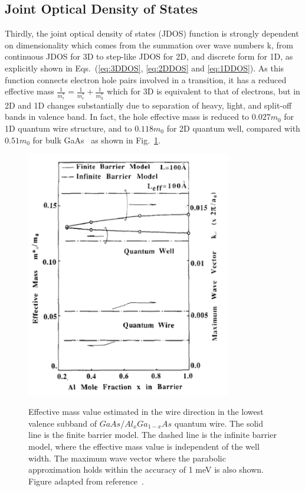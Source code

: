 \subsection{Joint Optical Density of States}

Thirdly, the joint optical density of states (JDOS) function is strongly
dependent on dimensionality which comes from the summation over wave numbers k,
from continuous JDOS for 3D to step-like JDOS for 2D, and discrete form for 1D,
as explicitly shown in Eqs.~(\ref{eq:3DDOS}, \ref{eq:2DDOS} and
\ref{eq:1DDOS}). As this function connects electron hole pairs involved in a
transition, it has a reduced effective mass
$\frac{1}{m_r^\ast}=\frac{1}{m_e^\ast}+\frac{1}{m_h^\ast}$ which for 3D is
equivalent to that of electrons, but in 2D and 1D changes substantially due to
separation of heavy, light, and split-off bands in valence band. In fact, the
hole effective mass is reduced to $0.027m_0$ for 1D quantum wire structure, and
to $0.118m_0$ for 2D quantum well, compared with $0.51m_0$ for bulk
GaAs~\cite{Suemune:1988jw} as shown in Fig.~\ref{EffectiveMass}.

\begin{figure}
  \caption[Effective mass value estimated in the wire direction in the lowest valence subband of $GaAs/Al_xGa_{1-x}As$ quantum wire.]{Effective mass value estimated in the wire direction in the lowest valence subband of $GaAs/Al_xGa_{1-x}As$ quantum wire. The solid line is the finite barrier model. The dashed line is the infinite barrier model, where the effective mass value is independent of the well width. The maximum wave vector where the parabolic approximation holds within the accuracy of 1 meV is also shown. Figure adapted from reference~\cite{Suemune:1988jw}.}
  \centering
  \includegraphics[width=0.8\textwidth]{pictures/RM/EffectiveMass}
  \label{EffectiveMass}
\end{figure}

